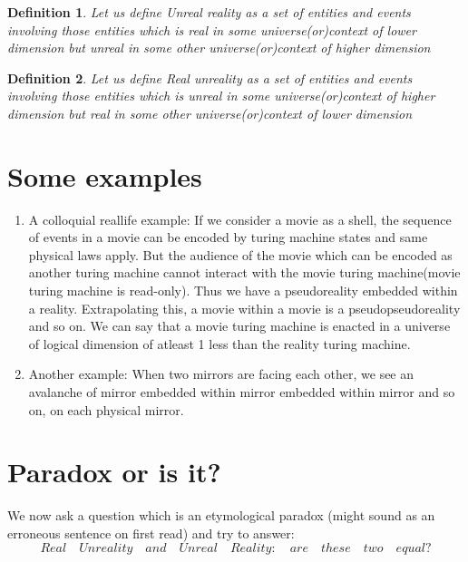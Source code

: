 \documentclass[11pt,onecolumn]{article}
\newtheorem{defn}{Definition}
\begin{document}
\begin{defn}
Let us define Unreal reality as a set of entities and events involving those entities which is real in some universe(or)context of lower dimension but unreal in some other universe(or)context of higher dimension 
\end{defn}

\begin{defn}
Let us define Real unreality as a set of entities and events involving those entities which is unreal in some universe(or)context of higher dimension but real in some other universe(or)context of lower dimension
\end{defn}

\section{Some examples}
\begin{enumerate}
\item A colloquial reallife example: If we consider a movie as a shell, the sequence of events in a movie can be encoded by  turing machine states and same physical laws apply. But the audience of the movie which can be encoded as another turing machine cannot interact with the movie turing machine(movie turing machine is read-only). Thus we have a pseudoreality embedded within a reality. Extrapolating this, a movie within a movie is a pseudopseudoreality and so on. We can say that a movie turing machine is enacted in a universe of logical dimension of atleast 1 less than the reality turing machine. 

\item Another example: When two mirrors are facing each other, we see an avalanche of mirror embedded  within mirror embedded within mirror and so on, on each physical mirror.
\end{enumerate}



\section{Paradox or is it?}

We now ask a question which is an etymological paradox (might sound as an erroneous sentence on first read) and try to answer:
\begin{equation}
Real \quad Unreality \quad and \quad Unreal \quad Reality: \quad are \quad these \quad two \quad equal?
\end{equation}
\end{document}
